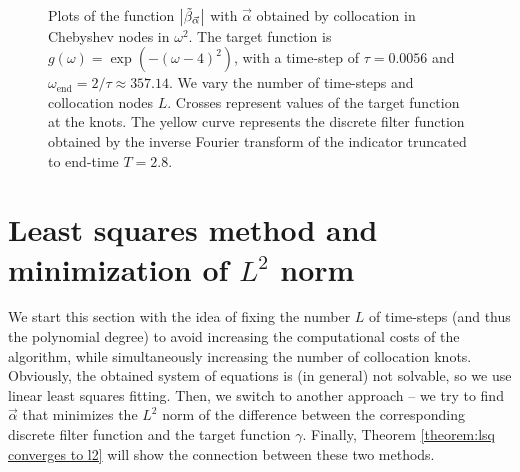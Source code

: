 \documentclass[a4paper,11pt,bibliography=totoc,listof=totoc,headinclude=true,cleardoublepage=empty,oneside]{scrbook}
\newcommand{\dffv}{\Tilde{\beta}_{\Vec{\alpha}}}
\newcommand{\e}{\mathrm{end}}
\begin{document}
\begin{figure}[h]
    \caption{Plots of the function $\left|\dffv\right|$ with $\Vec{\alpha}$ obtained by collocation in Chebyshev nodes in $\omega^2$. The target function is $g(\omega) = \exp\left(-(\omega-4)^2\right)$, with a time-step of $\tau = 0.0056$ and $\omega_\e = 2/\tau \approx 357.14$. We vary the number of time-steps and collocation nodes $L$. Crosses represent values of the target function at the knots. The yellow curve represents the discrete filter function obtained by the inverse Fourier transform of the indicator truncated to end-time $T=2.8$.}
    \label{fig:cheb coll cont ex}
\end{figure}



\section{Least squares method and minimization of $L^2$ norm}\label{section:lsq l2}
We start this section with the idea of fixing the number $L$ of time-steps (and thus the polynomial degree) to avoid increasing the computational costs of the algorithm, while simultaneously increasing the number of collocation knots. Obviously, the obtained system of equations is (in general) not solvable, so we use linear least squares fitting. Then, we switch to another approach -- we try to find $\Vec{\alpha}$ that minimizes the $L^2$ norm of the difference between the corresponding discrete filter function and the target function $\gamma$. Finally, Theorem \ref{theorem:lsq converges to l2} will show the connection between these two methods.
\end{document}
